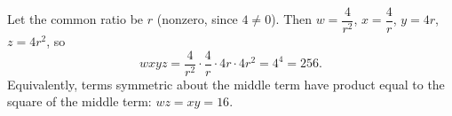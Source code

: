Let the common ratio be $r$ (nonzero, since $4\ne0$). Then $w=\dfrac{4}{r^2}$, $x=\dfrac{4}{r}$, $y=4r$, $z=4r^2$, so
\[
wxyz=\dfrac{4}{r^2}\cdot\dfrac{4}{r}\cdot4r\cdot4r^2=4^4=\boxed{256}.
\]
Equivalently, terms symmetric about the middle term have product equal to the square of the middle term: $wz=xy=16$.
